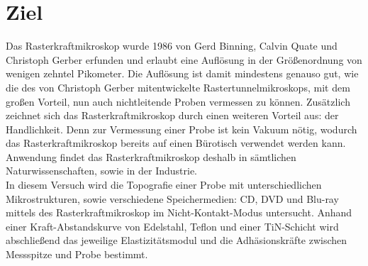 \section{Ziel}
\label{sec:Ziel}

Das Rasterkraftmikroskop wurde 1986 von Gerd Binning, Calvin Quate und Christoph
Gerber \cite{entw} erfunden und erlaubt eine Auflösung in der Größenordnung von
wenigen zehntel Pikometer. Die Auflösung ist damit mindestens genauso gut, wie die
des von Christoph Gerber mitentwickelte Rastertunnelmikroskops, mit dem großen
Vorteil, nun auch nichtleitende Proben vermessen zu können. Zusätzlich zeichnet
sich das Rasterkraftmikroskop durch einen weiteren Vorteil aus: der Handlichkeit.
Denn zur Vermessung einer Probe ist kein Vakuum nötig, wodurch das Rasterkraftmikroskop
bereits auf einen Bürotisch verwendet werden kann. Anwendung findet das
Rasterkraftmikroskop deshalb in sämtlichen Naturwissenschaften, sowie in der
Industrie.\\
In diesem Versuch wird die Topografie einer Probe mit unterschiedlichen
Mikrostrukturen, sowie verschiedene Speichermedien: CD, DVD und Blu-ray mittels
des Rasterkraftmikroskop im Nicht-Kontakt-Modus untersucht. Anhand einer
Kraft-Abstandskurve von Edelstahl, Teflon und einer TiN-Schicht wird abschließend
das jeweilige Elastizitätsmodul und die Adhäsionskräfte zwischen Messspitze und
Probe bestimmt.
